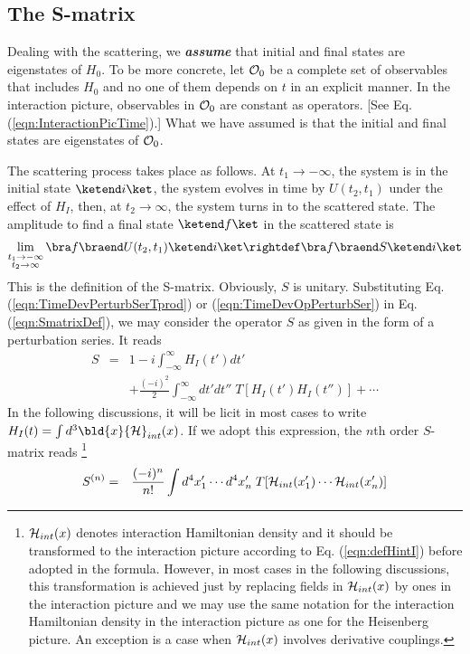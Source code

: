 \subsection{The S-matrix}
Dealing with the scattering, we {\bf \textit{assume}} that initial and final states are
eigenstates of $H_0$. To be more concrete, let ${\cal O}_0$ be a complete set of
observables that includes $H_0$ and no one of them depends on $t$ in an explicit manner.
In the interaction picture, observables in ${\cal O}_0$ are constant as operators. [See Eq.
(\ref{eqn:InteractionPicTime}).] What we have assumed is that the initial and final states
are eigenstates of ${\cal O}_0$.

The scattering process takes place as follows. At $t_1 \to -\infty$, the system is in the initial
state $\ketend i \ket$, the system evolves in time by $U(t_2, t_1)$ under the effect of
$H_I$, then, at $t_2 \to \infty$, the system turns in to the scattered state.
The amplitude to find a final state $\ketend f \ket$ in the scattered state is 
\begin{eqnarray}
\lim_{\stackrel{\scriptstyle t_1 \to -\infty}{t_2 \to \infty}}
\bra f \braend U(t_2, t_1) \ketend i \ket
\rightdef
\bra f \braend S \ketend i \ket
\label{eqn:SmatrixDef}
\end{eqnarray}
This is the definition of the S-matrix. Obviously, $S$ is unitary.
Substituting Eq. (\ref{eqn:TimeDevPerturbSerTprod}) or (\ref{eqn:TimeDevOpPerturbSer}) 
in Eq. (\ref{eqn:SmatrixDef}), we 
may consider the operator $S$ as given in the form of a perturbation series.
It reads
\begin{eqnarray}
 S 
&=&
1 
 -i \int_{-\infty}^\infty H_I (t') dt'
\nonumber\\
&&+
\frac{(-i)^2}{2}
\int_{-\infty}^\infty dt'
 dt''
\;T[ H_I (t') H_I (t'')]
+ \cdots
\label{eqn:SmatrixPertSer}
\end{eqnarray}
In the following discussions, it will be licit in most cases
to write $H_I(t) = \int d^3 \bld{x} {\cal H}_{int}(x)$.
If we adopt this expression, the $n$th order $S$-matrix reads
\footnote{
${\cal H}_{int}(x)$ denotes interaction Hamiltonian density
and it should be transformed to the interaction picture according to 
Eq. (\ref{eqn:defHintI}) before adopted in the formula.
However, in most cases in the following discussions,
this transformation is achieved just by replacing fields in
${\cal H}_{int}(x)$ by ones in the interaction picture
and we may use the same notation for the interaction Hamiltonian
density in the interaction picture as one for the Heisenberg picture.
An exception is a case when ${\cal H}_{int}(x)$ involves
derivative couplings.
}
\begin{eqnarray}
 S^{(n)} 
&=&
\frac{(-i)^n}{n!}
\int d^4x_1' \cdots d^4x_n'
\;T[ 
{\cal H}_{int}(x_1') \cdots {\cal H}_{int}(x_n')
]
\label{eqn:nthorderSmatrix}
\end{eqnarray}

